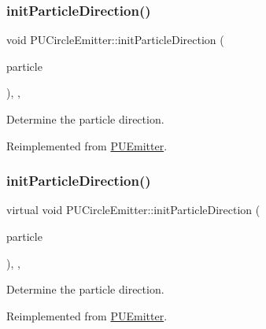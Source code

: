 \subsubsection{\texorpdfstring{init\+Particle\+Direction()}{initParticleDirection()}\hspace{0.1cm}{\footnotesize\ttfamily [1/2]}}
{\footnotesize\ttfamily void P\+U\+Circle\+Emitter\+::init\+Particle\+Direction (\begin{DoxyParamCaption}\item[{\hyperlink{structPUParticle3D}{P\+U\+Particle3D} $\ast$}]{particle }\end{DoxyParamCaption})\hspace{0.3cm}{\ttfamily [override]}, {\ttfamily [protected]}, {\ttfamily [virtual]}}

Determine the particle direction. 

Reimplemented from \hyperlink{classPUEmitter_a0dffa0a17008ddaaec73c6042ea1a019}{P\+U\+Emitter}.

\mbox{\label{classPUCircleEmitter_ae1e552dbbcd6df4a4e313a887a5d882c}} 
\subsubsection{\texorpdfstring{init\+Particle\+Direction()}{initParticleDirection()}\hspace{0.1cm}{\footnotesize\ttfamily [2/2]}}
{\footnotesize\ttfamily virtual void P\+U\+Circle\+Emitter\+::init\+Particle\+Direction (\begin{DoxyParamCaption}\item[{\hyperlink{structPUParticle3D}{P\+U\+Particle3D} $\ast$}]{particle }\end{DoxyParamCaption})\hspace{0.3cm}{\ttfamily [override]}, {\ttfamily [protected]}, {\ttfamily [virtual]}}

Determine the particle direction. 

Reimplemented from \hyperlink{classPUEmitter_a0dffa0a17008ddaaec73c6042ea1a019}{P\+U\+Emitter}.

\mbox{\label{classPUCircleEmitter_ae5f34473b3fc262944ed96489a5ed5ce}} 
